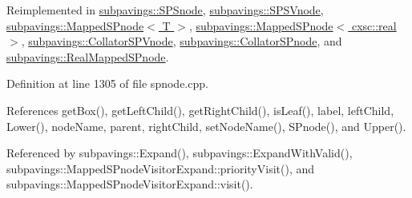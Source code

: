 \-Reimplemented in \hyperlink{classsubpavings_1_1SPSnode_adf0575b58b84a0910a8d5b67b6ec0f48}{subpavings\-::\-S\-P\-Snode}, \hyperlink{classsubpavings_1_1SPSVnode_a94c33927011a8d2613d40ccf6ccfafc1}{subpavings\-::\-S\-P\-S\-Vnode}, \hyperlink{classsubpavings_1_1MappedSPnode_a817b05cc2d60ff0ee1a98b0addf54131}{subpavings\-::\-Mapped\-S\-Pnode$<$ T $>$}, \hyperlink{classsubpavings_1_1MappedSPnode_a817b05cc2d60ff0ee1a98b0addf54131}{subpavings\-::\-Mapped\-S\-Pnode$<$ cxsc\-::real $>$}, \hyperlink{classsubpavings_1_1CollatorSPVnode_ae6555e847a720e43c07ad0c56788f9b6}{subpavings\-::\-Collator\-S\-P\-Vnode}, \hyperlink{classsubpavings_1_1CollatorSPnode_af0789230e2a9612f9b0644113e318f37}{subpavings\-::\-Collator\-S\-Pnode}, and \hyperlink{classsubpavings_1_1RealMappedSPnode_a4d0129dda149a950a06e9d2e3ff802c4}{subpavings\-::\-Real\-Mapped\-S\-Pnode}.



\-Definition at line 1305 of file spnode.\-cpp.



\-References get\-Box(), get\-Left\-Child(), get\-Right\-Child(), is\-Leaf(), label, left\-Child, \-Lower(), node\-Name, parent, right\-Child, set\-Node\-Name(), \-S\-Pnode(), and \-Upper().



\-Referenced by subpavings\-::\-Expand(), subpavings\-::\-Expand\-With\-Valid(), subpavings\-::\-Mapped\-S\-Pnode\-Visitor\-Expand\-::priority\-Visit(), and subpavings\-::\-Mapped\-S\-Pnode\-Visitor\-Expand\-::visit().


